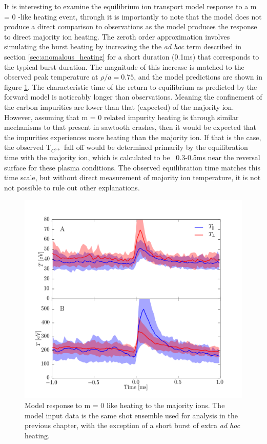 It is interesting to examine the equilibrium ion transport model response to a m = 0 -like heating event, through it is importantly to note that the model does not produce a direct comparison to observations as the model produces the response to direct majority ion heating. The zeroth order approximation involves simulating the burst heating by increasing the the \textit{ad hoc} term described in section \ref{sec:anomalous_heating} for a short duration (0.1ms) that corresponds to the typical burst duration. The magnitude of this increase is matched to the observed peak temperature at $\rho/a = 0.75$, and the model predictions are shown in figure \ref{fig:m0_model}. The characteristic time of the return to equilibrium as predicted by the forward model is noticeably longer than observations. Meaning the confinement of the carbon impurities are lower than that (expected) of the majority ion. However, assuming that m = 0 related impurity heating is through similar mechanisms to that present in sawtooth crashes, then it would be expected that the impurities experiences more heating than the majority ion. If that is the case, the observed T$_{C^{6+}}$ fall off would be determined primarily by the equilibration time with the majority ion, which is calculated to be ~0.3-0.5ms near the reversal surface for these plasma conditions. The observed equilibration time matches this time scale, but without direct measurement of majority ion temperature, it is not not possible to rule out other explanations. 

\begin{figure}
	\centering
	\includegraphics[width = 1.\linewidth]{./m0_and_impurity_heating/m0_anisotropy.png}
	\caption[Model response to m = 0 like heating to the majority ions.]{Model response to m = 0 like heating to the majority ions. The model input data is the same shot ensemble used for analysis in the previous chapter, with the exception of a short burst of extra \textit{ad hoc} heating. }\label{fig:m0_model}
\end{figure}

